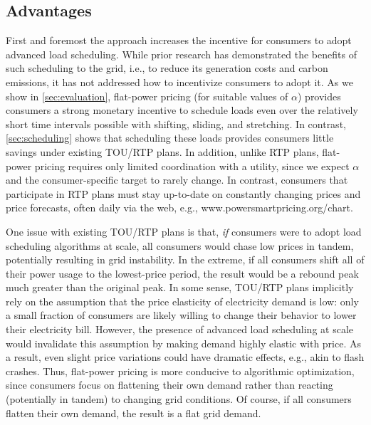\subsection{Advantages}

  First and foremost the approach increases the incentive for consumers to adopt advanced load scheduling.  While prior research has demonstrated the benefits of such scheduling to the grid, i.e., to reduce its generation costs and carbon emissions, it has not addressed how to incentivize consumers to adopt it.  As we show in \Section\ref{sec:evaluation}, flat-power pricing (for suitable values of $\alpha$) provides consumers a strong monetary incentive to schedule loads even over the relatively short time intervals possible with shifting, sliding, and stretching.  In contrast, \Section\ref{sec:scheduling} shows that scheduling these loads provides consumers little savings under existing TOU/RTP plans. In addition, unlike RTP plans, flat-power pricing requires only limited coordination with a utility, since we expect $\alpha$ and the consumer-specific target to rarely change.  In contrast, consumers that participate in RTP plans must stay up-to-date on constantly changing prices and price forecasts, often daily via the web, e.g., www.powersmartpricing.org/chart.

  One issue with existing TOU/RTP plans is that, \emph{if} consumers were to adopt load scheduling algorithms at scale, all consumers would chase low prices in tandem, potentially resulting in grid instability. In the extreme, if all consumers shift all of their power usage to the lowest-price period, the result would be a rebound peak much greater than the original peak.  In some sense, TOU/RTP plans implicitly rely on the assumption that the price elasticity of electricity demand is low:  only a small fraction of consumers are likely willing to change their behavior to lower their electricity bill.  However, the presence of advanced load scheduling at scale would invalidate this assumption by making demand highly elastic with price.  As a result, even slight price variations could have dramatic effects, e.g., akin to flash crashes.   Thus, flat-power pricing is more conducive to algorithmic optimization, since consumers focus on flattening their own demand rather than reacting (potentially in tandem) to changing grid conditions.  Of course, if all consumers flatten their own demand, the result is a flat grid demand.  

